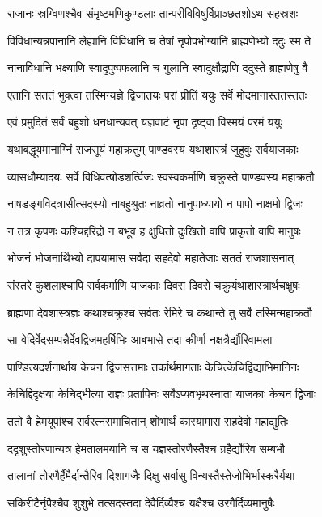 \twolineshloka
{राजानः स्रग्विणश्चैव संमृष्टमणिकुण्डलाः}
{तान्परीविविषुर्विप्राञ्छतशोऽथ सहस्रशः}


\twolineshloka
{विविधान्यन्नपानानि लेह्यानि विविधानि च}
{तेषां नृपोपभोग्यानि ब्राह्मणेभ्यो ददुः स्म ते}


\twolineshloka
{नानाविधानि भक्ष्याणि स्वादुपुष्पफलानि च}
{गुलानि स्वादुक्षौद्राणि ददुस्ते ब्राह्मणेषु वै}


\twolineshloka
{एतानि सततं भुक्त्वा तस्मिन्यज्ञे द्विजातयः}
{परां प्रीतिं ययुः सर्वे मोदमानास्ततस्ततः}


\twolineshloka
{एवं प्रमुदितं सर्वं बहुशो धनधान्यवत्}
{यज्ञवाटं नृपा दृष्ट्वा विस्मयं परमं ययुः}


\twolineshloka
{यथाबद्धूयमानाग्निं राजसूयं महाक्रतुम्}
{पाण्डवस्य यथाशास्त्रं जुहुवुः सर्वयाजकाः}


\twolineshloka
{व्यासधौम्यादयः सर्वे विधिवत्षोडशर्त्विजः}
{स्वस्वकर्माणि चक्रुस्ते पाण्डवस्य महाक्रतौ}


\twolineshloka
{नाषडङ्गविदत्रासीत्सदस्यो नाबहुश्रुतः}
{नाव्रतो नानुपाध्यायो न पापो नाक्षमो द्विजः}


\twolineshloka
{न तत्र कृपणः कश्चिद्दरिद्रो न बभूव ह}
{क्षुधितो दुःखितो वापि प्राकृतो वापि मानुषः}


\twolineshloka
{भोजनं भोजनार्थिभ्यो दापयामास सर्वदा}
{सहदेवो महातेजाः सततं राजशासनात्}


\twolineshloka
{संस्तरे कुशलाश्चापि सर्वकर्माणि याजकाः}
{दिवस दिवसे चक्रुर्यथाशास्त्रार्थचक्षुषः}


\twolineshloka
{ब्राह्मणा देवशास्त्रज्ञः कथाश्चक्रुश्च सर्वतः}
{रेमिरे च कथान्ते तु सर्वे तस्मिन्महाक्रतौ}


\twolineshloka
{सा वेदिर्वेदसम्पन्नैर्देवद्विजमहर्षिभिः}
{आबभासे तदा कीर्णा नक्षत्रैर्द्यौरिवामला}


\twolineshloka
{पाण्डित्यदर्शनार्थाय केचन द्विजसत्तमाः}
{तर्कार्थमागताः केचित्केचिद्विद्याभिमानिनः}


\twolineshloka
{केचिद्दिदृक्षया केचिद्भीत्या राज्ञः प्रतापिनः}
{सर्वेऽप्यवभृथस्नाता याजकाः केचन द्विजाः}


\twolineshloka
{ततो वै हेमयूपांश्च सर्वरत्नसमाचितान्}
{शोभार्थं कारयामास सहदेवो महाद्युतिः}


\twolineshloka
{ददृशुस्तोरणान्यत्र हेमतालमयानि च}
{स यज्ञस्तोरणैस्तैश्च ग्रहैर्द्योरिव सम्बभौ}


\twolineshloka
{तालानां तोरणैर्हैमैर्दान्तैरिव दिशागजैः}
{दिक्षु सर्वासु विन्यस्तैस्तेजोभिर्भास्करैर्यथा}


\twolineshloka
{सकिरीटैर्नृपैश्चैव शुशुभे तत्सदस्तदा}
{देवैर्दिव्यैश्च यक्षैश्च उरगैर्दिव्यमानुषैः}


